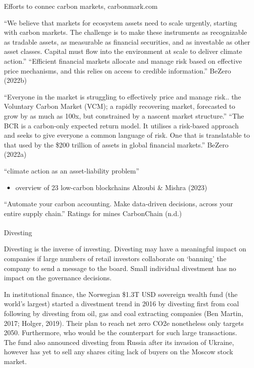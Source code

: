 \documentclass[
  letterpaper,
  DIV=11,
  numbers=noendperiod]{scrartcl}
\makeatletter
\let\oldparagraph\paragraph
\renewcommand{\paragraph}{
    \@ifstar
      \xxxParagraphStar
      \xxxParagraphNoStar
  }
\newcommand{\xxxParagraphStar}[1]{\oldparagraph*{#1}\mbox{}}
\newcommand{\xxxParagraphNoStar}[1]{\oldparagraph{#1}\mbox{}}
\providecommand{\tightlist}{%
  \setlength{\itemsep}{0pt}\setlength{\parskip}{0pt}}\usepackage{longtable,booktabs,array}
\makeatother
\begin{document}
Efforts to connec carbon markets, carbonmark.com

``We believe that markets for ecosystem assets need to scale urgently,
starting with carbon markets. The challenge is to make these instruments
as recognizable as tradable assets, as measurable as financial
securities, and as investable as other asset classes. Capital must flow
into the environment at scale to deliver climate action.'' ``Efficient
financial markets allocate and manage risk based on effective price
mechanisms, and this relies on access to credible information.'' BeZero
(2022b)

``Everyone in the market is struggling to effectively price and manage
risk.. the Voluntary Carbon Market (VCM); a rapidly recovering market,
forecasted to grow by as much as 100x, but constrained by a nascent
market structure.'' ``The BCR is a carbon-only expected return model. It
utilises a risk-based approach and seeks to give everyone a common
language of risk. One that is translatable to that used by the \$200
trillion of assets in global financial markets.'' BeZero (2022a)

``climate action as an asset-liability problem''

\begin{itemize}
\tightlist
\item
  overview of 23 low-carbon blockchains Alzoubi \& Mishra (2023)
\end{itemize}

``Automate your carbon accounting. Make data-driven decisions, across
your entire supply chain.'' Ratings for mines CarbonChain (n.d.)

\paragraph{Divesting}\label{divesting}

Divesting is the inverse of investing. Divesting may have a meaningful
impact on companies if large numbers of retail investors collaborate on
`banning' the company to send a message to the board. Small individual
divestment has no impact on the governance decisions.

In institutional finance, the Norwegian \$1.3T USD sovereign wealth fund
(the world's largest) started a divestment trend in 2016 by divesting
first from coal following by divesting from oil, gas and coal extracting
companies (Ben Martin, 2017; Holger, 2019). Their plan to reach net zero
CO2e nonetheless only targets 2050. Furthermore, who would be the
counterpart for such large transactions. The fund also announced
divesting from Russia after its invasion of Ukraine, however has yet to
sell any shares citing lack of buyers on the Moscow stock market.
\end{document}
